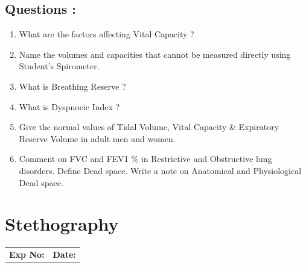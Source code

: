 \documentclass[a4paper,12pt]{book}
\begin{document}
														\section*{Questions :}
														\begin{enumerate}
\item{														 What are the factors affecting Vital Capacity ?}
\item{														 Name the volumes and capacities that cannot be measured directly using Student’s Spirometer.}
\item{														 What is Breathing Reserve ?}
\item{														 What is Dyspnoeic Index ?}
\item{														 Give the normal values of Tidal Volume, Vital Capacity \& Expiratory Reserve Volume in adult men and women.}
\item{														 Comment on FVC and FEV1 \% in Restrictive and Obstructive lung disorders.}
														 Define Dead space. Write a note on Anatomical and Physiological Dead space.

														\end{enumerate}
															\chapter*{\centering Stethography}
															\begin{tabular}{p{5in} p{1in}}
																\textbf{Exp No:}  & \textbf{Date:}\\
															\end{tabular}
\end{document}
